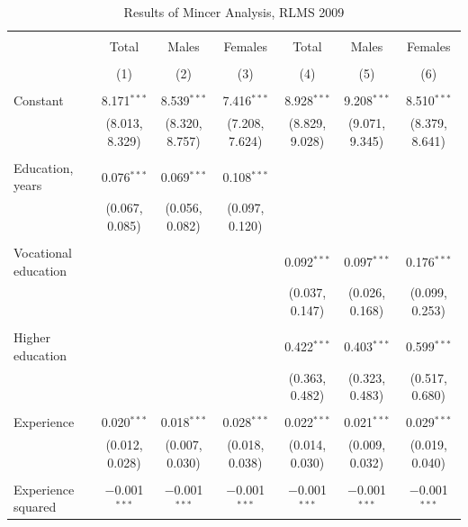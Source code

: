 \documentclass[alpha-refs]{wiley-article-01g}
\begin{document}
\begin{landscape}
	
	\fontsize{9}{11}
	\selectfont
	
	\begin{table}[!htbp] \centering 
\renewcommand{\arraystretch}{1.0}
		\caption{Results of Mincer Analysis, RLMS 2009} 
		\label{} 
		\begin{tabular}{@{\extracolsep{5pt}}lcccccc} 
			\\[-.8ex]\hline 
			\hline \\[-.8ex] 
			& Total & Males & Females & Total & Males & Females \\ 
			\\[-.8ex] & (1) & (2) & (3) & (4) & (5) & (6)\\ 
			\hline \\[-.8ex] 
			Constant & 8.171$^{***}$ & 8.539$^{***}$ & 7.416$^{***}$ & 8.928$^{***}$ & 9.208$^{***}$ & 8.510$^{***}$ \\ 
			& (8.013, 8.329) & (8.320, 8.757) & (7.208, 7.624) & (8.829, 9.028) & (9.071, 9.345) & (8.379, 8.641) \\ 
			& & & & & & \\ 
			Education, years & 0.076$^{***}$ & 0.069$^{***}$ & 0.108$^{***}$ &  &  &  \\ 
			& (0.067, 0.085) & (0.056, 0.082) & (0.097, 0.120) &  &  &  \\ 
			& & & & & & \\ 
			Vocational education &  &  &  & 0.092$^{***}$ & 0.097$^{***}$ & 0.176$^{***}$ \\ 
			&  &  &  & (0.037, 0.147) & (0.026, 0.168) & (0.099, 0.253) \\ 
			& & & & & & \\ 
			Higher education &  &  &  & 0.422$^{***}$ & 0.403$^{***}$ & 0.599$^{***}$ \\ 
			&  &  &  & (0.363, 0.482) & (0.323, 0.483) & (0.517, 0.680) \\ 
			& & & & & & \\ 
			Experience & 0.020$^{***}$ & 0.018$^{***}$ & 0.028$^{***}$ & 0.022$^{***}$ & 0.021$^{***}$ & 0.029$^{***}$ \\ 
			& (0.012, 0.028) & (0.007, 0.030) & (0.018, 0.038) & (0.014, 0.030) & (0.009, 0.032) & (0.019, 0.040) \\ 
			& & & & & & \\ 
			Experience squared & $-$0.001$^{***}$ & $-$0.001$^{***}$ & $-$0.001$^{***}$ & $-$0.001$^{***}$ & $-$0.001$^{***}$ & $-$0.001$^{***}$ \\ 

\end{tabular}
\end{table}
\end{landscape}
\end{document}
